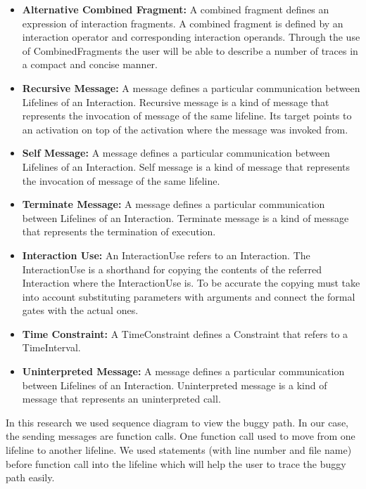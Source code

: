\begin{itemize}
	\item \textbf{Alternative Combined Fragment:} A combined fragment defines an expression of interaction fragments. A combined fragment is defined by an interaction operator and corresponding interaction operands. Through the use of CombinedFragments the user will be able to describe a number of traces in a compact and concise manner.
	
	\item \textbf{Recursive Message:} A message defines a particular communication between Lifelines of an Interaction. Recursive message is a kind of message that represents the invocation of message of the same lifeline. Its target points to an activation on top of the activation where the message was invoked from.
	
	\item \textbf{Self Message:} A message defines a particular communication between Lifelines of an Interaction. Self message is a kind of message that represents the invocation of message of the same lifeline.
	
	\item \textbf{Terminate Message:} A message defines a particular communication between Lifelines of an Interaction. Terminate message is a kind of message that represents the termination of execution.
	
	\item \textbf{Interaction Use:} An InteractionUse refers to an Interaction. The InteractionUse is a shorthand for copying the contents of the referred Interaction where the InteractionUse is. To be accurate the copying must take into account substituting parameters with arguments and connect the formal gates with the actual ones.
	
	\item \textbf{Time Constraint:} A TimeConstraint defines a Constraint that refers to a TimeInterval.
	
	\item \textbf{Uninterpreted Message:} A message defines a particular communication between Lifelines of an Interaction. Uninterpreted message is a kind of message that represents an uninterpreted call.
	
	
\end{itemize}

In this research we used sequence diagram to view the buggy path. In our case, the sending messages are function calls. One function call used to move from one lifeline to another lifeline. We used statements (with line number and file name) before function call into the lifeline which will help the user to trace the buggy path easily.

